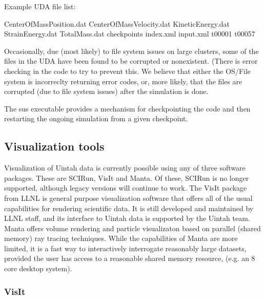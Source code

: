 Example UDA file list:

CenterOfMassPosition.dat
CenterOfMassVelocity.dat
KineticEnergy.dat
StrainEnergy.dat
TotalMass.dat
checkpoints
index.xml
input.xml
t00001
t00057


Occasionally, due (most likely) to file system issues on large
clusters, some of the files in the UDA have been found to be corrupted
or nonexistent.  (There is error checking in the code to try to
prevent this.  We believe that either the OS/File system is
incorreclty returning error codes, or, more likely, that the files are
corrupted (due to file system issues) after the simulation is done.


The sus executable provides a mechanism for checkpointing the code and
then restarting the ongoing simulation from a given checkpoint.



\subsection{Visualization tools}

Visualization of Uintah data is currently possible using any of three
software packages.  These are SCIRun, VisIt and Manta.  Of these, SCIRun is
no longer supported, although legacy versions will continue to work.  The
VisIt package from LLNL is general purpose visualization software that offers
all of the usual capabilities for rendering scientific data.  It is still
developed and maintained by LLNL staff, and its interface to Uintah data is
supported by the Uintah team.  Manta offers volume rendering and particle
visualizaton based on parallel (shared memory) ray tracing techniques.
While the capabilities of Manta are more limited, it is a fast way to
interactively interrogate reasonably large datasets, provided the user has
access to a reasonable shared memory resource, (e.g. an 8 core desktop system).

\subsubsection{VisIt}

